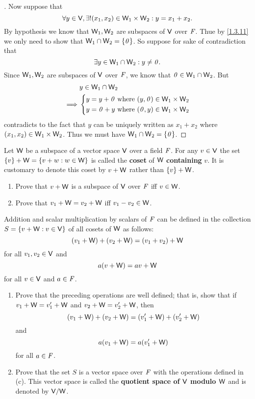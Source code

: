 \begin{proof}[]
  Now suppose that
  \[
    \forall y \in \mathsf{V}, \exists! (x_1, x_2) \in \mathsf{W}_1 \times \mathsf{W}_2 : y = x_1 + x_2.
  \]
  By hypothesis we know that \(\mathsf{W}_1, \mathsf{W}_2\) are subspaces of \(\mathsf{V}\) over \(\mathit{F}\).
  Thue by \cref{1.3.11} we only need to show that \(\mathsf{W}_1 \cap \mathsf{W}_2 = \left\lbrace\mathit{0}\right\rbrace\).
  So suppose for sake of contradiction that
  \[
    \exists y \in \mathsf{W}_1 \cap \mathsf{W}_2 : y \neq \mathit{0}.
  \]
  Since \(\mathsf{W}_1, \mathsf{W}_2\) are subspaces of \(\mathsf{V}\) over \(\mathit{F}\), we know that \(\mathit{0} \in \mathsf{W}_1 \cap \mathsf{W}_2\).
  But
  \begin{align*}
             & y \in \mathsf{W}_1 \cap \mathsf{W}_2                                     \\
    \implies & \begin{dcases}
                 y = y + \mathit{0} \text{ where } (y, \mathit{0}) \in \mathsf{W}_1 \times \mathsf{W}_2 \\
                 y = \mathit{0} + y \text{ where } (\mathit{0}, y) \in \mathsf{W}_1 \times \mathsf{W}_2
               \end{dcases}
  \end{align*}
  contradicts to the fact that \(y\) can be uniquely written as \(x_1 + x_2\) where \((x_1, x_2) \in \mathsf{W}_1 \times \mathsf{W}_2\).
  Thus we must have \(\mathsf{W}_1 \cap \mathsf{W}_2 = \left\lbrace\mathit{0}\right\rbrace\).
\end{proof}

\begin{ex}\label{ex:1.3.31}
  Let \(\mathsf{W}\) be a subspace of a vector space \(\mathsf{V}\) over a field \(\mathit{F}\).
  For any \(v \in \mathsf{V}\) the set \(\left\lbrace v\right\rbrace + \mathsf{W} = \left\lbrace v + w : w \in \mathsf{W}\right\rbrace\) is called the \textbf{coset} of \(\mathsf{W}\) \textbf{containing} \(v\).
  It is customary to denote this coset by \(v + \mathsf{W}\) rather than \(\left\lbrace v\right\rbrace + \mathsf{W}\).
  \begin{enumerate}
    \item Prove that \(v + \mathsf{W}\) is a subspace of \(\mathsf{V}\) over \(\mathit{F}\) iff \(v \in \mathsf{W}\).
    \item Prove that \(v_1 + \mathsf{W} = v_2 + \mathsf{W}\) iff \(v_1 - v_2 \in \mathsf{W}\).
  \end{enumerate}
  Addition and scalar multiplication by scalars of \(\mathit{F}\) can be defined in the collection \(S = \left\lbrace v + \mathsf{W} : v \in \mathsf{V}\right\rbrace\) of all cosets of \(\mathsf{W}\) as follows:
  \[
    (v_1 + \mathsf{W}) + (v_2 + \mathsf{W}) = (v_1 + v_2) + \mathsf{W}
  \]
  for all \(v_1, v_2 \in \mathsf{V}\) and
  \[
    a(v + \mathsf{W}) = av + \mathsf{W}
  \]
  for all \(v \in \mathsf{V}\) and \(a \in \mathit{F}\).
  \begin{enumerate}[resume]
    \item Prove that the preceding operations are well defined;
          that is, show that if \(v_1 + \mathsf{W} = v_1' + \mathsf{W}\) and \(v_2 + \mathsf{W} = v_2' + \mathsf{W}\), then
          \[
            (v_1 + \mathsf{W}) + (v_2 + \mathsf{W}) = (v_1' + \mathsf{W}) + (v_2' + \mathsf{W})
          \]
          and
          \[
            a(v_1 + \mathsf{W}) = a(v_1' + \mathsf{W})
          \]
          for all \(a \in \mathit{F}\).
    \item Prove that the set \(S\) is a vector space over \(\mathit{F}\) with the operations defined in (c).
          This vector space is called the \textbf{quotient space of \(\mathsf{V}\) modulo \(\mathsf{W}\)} and is denoted by \(\mathsf{V} / \mathsf{W}\).
  \end{enumerate}
\end{ex}

